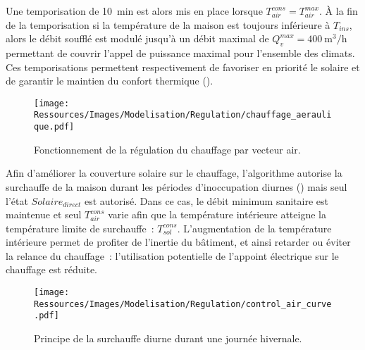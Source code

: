 Une temporisation de \SI{10}{min} est alors mis en place lorsque $T_{air}^{cons} = T_{air}^{max}$.
À la fin de la temporisation si la température de la maison est
toujours inférieure à $T_{ins}$, alors le débit soufflé est modulé jusqu’à un débit maximal de
$Q_{v}^{max} = \SI[per-mode=symbol]{400}{\meter\cubed\per\hour}$ permettant de couvrir
l’appel de puissance maximal pour l’ensemble des climats. Ces
temporisations permettent respectivement de favoriser en priorité le solaire et de
garantir le maintien du confort thermique ().

\begin{figure}
    \centering
    \texttt{[image: Ressources/Images/Modelisation/Regulation/chauffage\_aeraulique.pdf]}
    \caption[Fonctionnement de la régulation du chauffage par vecteur air]
            {Fonctionnement de la régulation du chauffage par vecteur air.}
    \label{fig:chauffage_aeraulique}
\end{figure}

Afin d’améliorer la couverture solaire sur le chauffage, l’algorithme autorise la
surchauffe de la maison durant les périodes d’inoccupation diurnes
() mais seul l’état $Solaire_{direct}$ est autorisé. Dans ce
cas, le débit minimum sanitaire est maintenue et seul $T_{air}^{cons}$ varie afin que la
température intérieure atteigne la température limite de surchauffe~: $T^{cons}_{sol}$.
L’augmentation de la température intérieure permet de profiter de l’inertie du bâtiment, et
ainsi retarder ou éviter la relance du chauffage~: l’utilisation potentielle de
l’appoint électrique sur le chauffage est réduite.
\begin{figure}
    \centering
    \texttt{[image: Ressources/Images/Modelisation/Regulation/control\_air\_curve.pdf]}
    \caption[Principe de la surchauffe diurne durant une journée hivernale]
            {Principe de la surchauffe diurne durant une journée hivernale.}
    \label{fig:control_air}
\end{figure}



